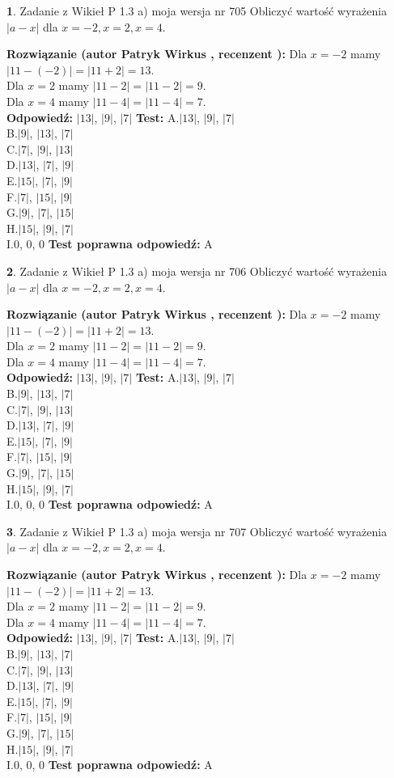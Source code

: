 \documentclass[12pt, a4paper]{article}
\theoremstyle{definition} %
\newtheorem{zad}{}
\newcommand{\zadStart}[1]{\begin{zad}#1\newline}
\newcommand{\zadStop}{\end{zad}}
\newcommand{\rozwStart}[2]{\noindent \textbf{Rozwiązanie (autor #1 , recenzent #2): }\newline}
\newcommand{\rozwStop}{\newline}
\newcommand{\odpStart}{\noindent \textbf{Odpowiedź:}\newline}
\newcommand{\odpStop}{\newline}
\newcommand{\testStart}{\noindent \textbf{Test:}\newline}
\newcommand{\testStop}{\newline}
\newcommand{\kluczStart}{\noindent \textbf{Test poprawna odpowiedź:}\newline}
\newcommand{\kluczStop}{\newline}
\begin{document}
\zadStart{Zadanie z Wikieł P 1.3 a) moja wersja nr 705}
Obliczyć wartość wyrażenia $|a - x|$ dla $x=-2,x=2,x=4$.
\zadStop
\rozwStart{Patryk Wirkus}{}
Dla $x = -2$ mamy $|11 - (-2)| = |11 + 2| = 13$.\\
Dla $x = 2$ mamy $|11 - 2| = |11 - 2| = 9$.\\
Dla $x = 4$ mamy $|11 - 4| = |11 - 4| = 7$.\\
\rozwStop
\odpStart
$|13|$, $|9|$, $|7|$
\odpStop
\testStart
A.$|13|$, $|9|$, $|7|$\\
B.$|9|$, $|13|$, $|7|$\\
C.$|7|$, $|9|$, $|13|$\\
D.$|13|$, $|7|$, $|9|$\\
E.$|15|$, $|7|$, $|9|$\\
F.$|7|$, $|15|$, $|9|$\\
G.$|9|$, $|7|$, $|15|$\\
H.$|15|$, $|9|$, $|7|$\\
I.$0$, $0$, $0$
\testStop
\kluczStart
A
\kluczStop



\zadStart{Zadanie z Wikieł P 1.3 a) moja wersja nr 706}
Obliczyć wartość wyrażenia $|a - x|$ dla $x=-2,x=2,x=4$.
\zadStop
\rozwStart{Patryk Wirkus}{}
Dla $x = -2$ mamy $|11 - (-2)| = |11 + 2| = 13$.\\
Dla $x = 2$ mamy $|11 - 2| = |11 - 2| = 9$.\\
Dla $x = 4$ mamy $|11 - 4| = |11 - 4| = 7$.\\
\rozwStop
\odpStart
$|13|$, $|9|$, $|7|$
\odpStop
\testStart
A.$|13|$, $|9|$, $|7|$\\
B.$|9|$, $|13|$, $|7|$\\
C.$|7|$, $|9|$, $|13|$\\
D.$|13|$, $|7|$, $|9|$\\
E.$|15|$, $|7|$, $|9|$\\
F.$|7|$, $|15|$, $|9|$\\
G.$|9|$, $|7|$, $|15|$\\
H.$|15|$, $|9|$, $|7|$\\
I.$0$, $0$, $0$
\testStop
\kluczStart
A
\kluczStop



\zadStart{Zadanie z Wikieł P 1.3 a) moja wersja nr 707}
Obliczyć wartość wyrażenia $|a - x|$ dla $x=-2,x=2,x=4$.
\zadStop
\rozwStart{Patryk Wirkus}{}
Dla $x = -2$ mamy $|11 - (-2)| = |11 + 2| = 13$.\\
Dla $x = 2$ mamy $|11 - 2| = |11 - 2| = 9$.\\
Dla $x = 4$ mamy $|11 - 4| = |11 - 4| = 7$.\\
\rozwStop
\odpStart
$|13|$, $|9|$, $|7|$
\odpStop
\testStart
A.$|13|$, $|9|$, $|7|$\\
B.$|9|$, $|13|$, $|7|$\\
C.$|7|$, $|9|$, $|13|$\\
D.$|13|$, $|7|$, $|9|$\\
E.$|15|$, $|7|$, $|9|$\\
F.$|7|$, $|15|$, $|9|$\\
G.$|9|$, $|7|$, $|15|$\\
H.$|15|$, $|9|$, $|7|$\\
I.$0$, $0$, $0$
\testStop
\kluczStart
A
\kluczStop
\end{document}
